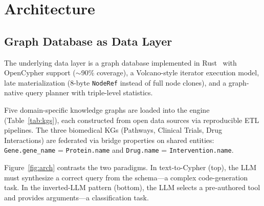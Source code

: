 \documentclass[sigconf, anonymous, review]{acmart}
\begin{document}
\section{Architecture}\label{sec:architecture}

\subsection{Graph Database as Data Layer}

The underlying data layer is a graph database implemented in
Rust~\cite{anon2026graphdb} with OpenCypher support (${\sim}$90\%
coverage), a Volcano-style iterator execution model, late
materialization (8-byte \texttt{NodeRef} instead of full node clones),
and a graph-native query planner with triple-level statistics.

Five domain-specific knowledge graphs are loaded into the engine
(Table~\ref{tab:kgs}), each constructed from open data sources
via reproducible ETL pipelines.  The three biomedical KGs
(Pathways, Clinical Trials, Drug Interactions) are federated
via bridge properties on shared entities: \texttt{Gene.gene\_name}
= \texttt{Protein.name} and \texttt{Drug.name} =
\texttt{Intervention.name}.

Figure~\ref{fig:arch} contrasts the two paradigms.
In text-to-Cypher (top), the LLM must synthesize a correct query
from the schema---a complex code-generation task.
In the inverted-LLM pattern (bottom), the LLM selects a
pre-authored tool and provides arguments---a classification task.
\end{document}
